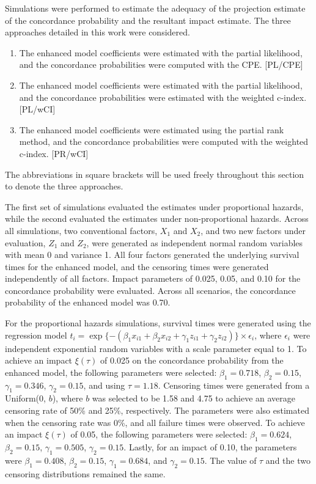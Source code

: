 \documentclass[12pt]{article}
\begin{document}
Simulations were performed to estimate the adequacy of the projection estimate of the concordance probability and the resultant impact estimate. The three approaches detailed in this work were considered.
\begin{enumerate}
    \item  The enhanced model coefficients were estimated with the partial likelihood, and the concordance probabilities were computed with the CPE. [PL/CPE]
    \item The enhanced model coefficients were estimated with the partial likelihood, and the concordance probabilities were estimated with the weighted c-index. [PL/wCI]
    \item The enhanced model coefficients were estimated using the partial rank method, and the concordance probabilities were computed with the weighted c-index. [PR/wCI] 
    \end{enumerate}
The abbreviations in square brackets will be used freely throughout this section to denote the three approaches.

The first set of simulations evaluated the estimates under proportional hazards, while the second evaluated the estimates under non-proportional hazards. Across all simulations, two conventional factors, $X_1$ and $X_2$, and two new factors under evaluation, $Z_1$ and $Z_2$, were generated as independent normal random variables with mean 0 and variance 1. All four factors generated the underlying survival times for the enhanced model, and the censoring times were generated independently of all factors. Impact parameters of 0.025, 0.05, and 0.10 for the concordance probability were evaluated. Across all scenarios, the concordance probability of the enhanced model was 0.70.

For the proportional hazards simulations, survival times were generated using the regression model $t_i =\exp\{ -(\beta_1x_{i1}+\beta_2 x_{i2}+\gamma_1 z_{i1}+\gamma_2 z_{i2})\} \times \epsilon_i$, where $\epsilon_i$ were independent exponential random variables with a scale parameter equal to 1. To achieve an impact $\xi(\tau)$ of 0.025 on the concordance probability from the enhanced model, the following parameters were selected: $\beta_1=0.718$, $\beta_2=0.15$, $\gamma_1=0.346$, $\gamma_2=0.15$, and using $\tau=1.18$. Censoring times were generated from a Uniform($0$, $b$), where $b$ was selected to be  1.58 and 4.75 to achieve an average censoring rate of 50\% and 25\%, respectively. The parameters were also estimated when the censoring rate was 0\%, and all failure times were observed. To achieve an impact $\xi(\tau)$ of 0.05, the following parameters were selected: $\beta_1=0.624$, $\beta_2=0.15$, $\gamma_1=0.505$, $\gamma_2=0.15$. Lastly, for an impact of 0.10, the parameters were $\beta_1=0.408$, $\beta_2=0.15$, $\gamma_1=0.684$, and $\gamma_2=0.15$. The value of $\tau$ and the two censoring distributions remained the same.
\end{document}
